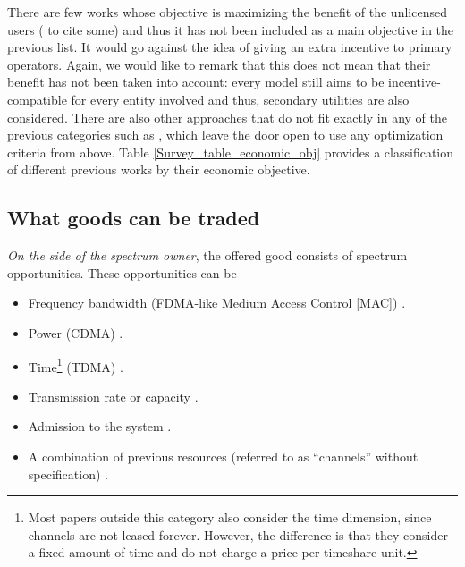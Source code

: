 There are few works whose objective is maximizing the benefit of the unlicensed users (\cite{ref:Niyato2007_Game,ref:Illeri2005,ref:Niyato2009_Dyn} to cite some) and thus it has not been included as a main objective in the previous list. It would go against the idea of giving an extra incentive to primary operators. Again, we would like to remark that this does not mean that their benefit has not been taken into account: every model still aims to be incentive-compatible for every entity involved and thus, secondary utilities are also considered. There are also other approaches that do not fit exactly in any of the previous categories such as \cite{ref:Illeri2005,ref:Zhou2008}, which leave the door open to use any optimization criteria from above. Table \ref{Survey_table_economic_obj} provides a classification of different previous works by their economic objective.



\subsection{What goods can be traded}
\label{subsec:What}
\textit{On the side of the spectrum owner}, the offered good consists of spectrum opportunities. These opportunities can be
\begin{itemize}
\item Frequency bandwidth (FDMA-like Medium Access Control [MAC]) \cite{ref:Niyato2007_Game,ref:Niyato2008_Comp,ref:Duan2010_Cog,ref:Duan2010_Comp,ref:Zhu2012_Dyn,ref:Xu2010,ref:Sengupta2007,ref:Sengupta2009,ref:Niyato2008_Mark,ref:Niyato2010,ref:Wang2010_Spec}. 
\item Power (CDMA) \cite{ref:Wang2008,ref:Yu2010,ref:Gao2011,ref:Huang2006,ref:Jayaweera2009,ref:Jayaweera2010,ref:Vazquez2010}.
\item Time\footnote{Most papers outside this category also consider the time dimension, since channels are not leased forever. However, the difference is that they consider a fixed amount of time and do not charge a price per timeshare unit.} (TDMA)  \cite{ref:Xu2011,ref:Simeone2008,ref:Zhang2009,ref:Li2011,ref:Duan2011_Contract,ref:Niyato2007_Eq}.
\item Transmission rate or capacity \cite{ref:Illeri2005,ref:Jia2008,ref:Maille2009} .
\item Admission to the system \cite{ref:Kaskebar2012,ref:Mutlu2008,ref:Yang2011}.
\item A combination of previous resources (referred to as ``channels'' without specification) \cite{ref:Xu2012,ref:Zhou2008,ref:Zhu2012,ref:Xing2007,ref:Jia2009_Rev,ref:Niyato2009_Dyn,ref:Niyato2007_Hier,ref:Gao2011_MAP,ref:Zhou2009_TRUST}. 
\end{itemize}

